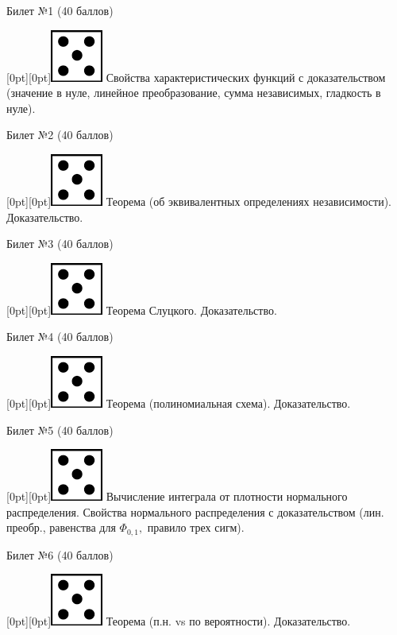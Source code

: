\documentclass[10pt]{article}
\begin{document}
\begin{center} {\Large Билет №1 (40 баллов)} \end{center}
\raisebox{-1pt}[0pt][0pt]{\includegraphics[width=0.02\linewidth]{5.png}} Свойства характеристических функций с доказательством (значение в нуле, линейное преобразование, сумма независимых, гладкость в нуле). \\
\begin{center} {\Large Билет №2 (40 баллов)} \end{center}
\raisebox{-1pt}[0pt][0pt]{\includegraphics[width=0.02\linewidth]{5.png}} Теорема (об эквивалентных определениях независимости). Доказательство. \\
\begin{center} {\Large Билет №3 (40 баллов)} \end{center}
\raisebox{-1pt}[0pt][0pt]{\includegraphics[width=0.02\linewidth]{5.png}} Теорема Слуцкого. Доказательство. \\
\begin{center} {\Large Билет №4 (40 баллов)} \end{center}
\raisebox{-1pt}[0pt][0pt]{\includegraphics[width=0.02\linewidth]{5.png}} Теорема (полиномиальная схема). Доказательство. \\
\begin{center} {\Large Билет №5 (40 баллов)} \end{center}
\raisebox{-1pt}[0pt][0pt]{\includegraphics[width=0.02\linewidth]{5.png}} Вычисление интеграла от плотности нормального распределения.  Свойства нормального распределения с доказательством (лин. преобр., равенства для $\Phi_{0,1},$ правило трех сигм). \\
\begin{center} {\Large Билет №6 (40 баллов)} \end{center}
\raisebox{-1pt}[0pt][0pt]{\includegraphics[width=0.02\linewidth]{5.png}} Теорема (п.н. vs по вероятности). Доказательство. \\
\end{document}
